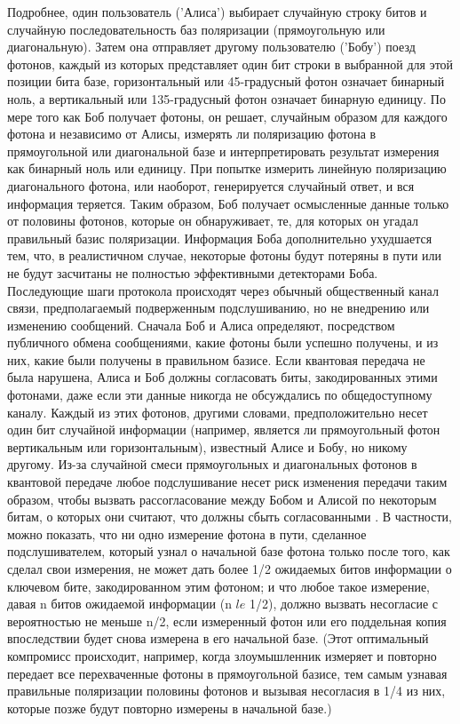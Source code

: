 Подробнее, один пользователь ('Алиса') выбирает случайную строку битов и случайную последовательность баз поляризации (прямоугольную или диагональную). Затем она отправляет другому пользователю ('Бобу') поезд фотонов, каждый из которых представляет один бит строки в выбранной для этой позиции бита базе, горизонтальный или 45-градусный фотон означает бинарный ноль, а вертикальный или 135-градусный фотон означает бинарную единицу. По мере того как Боб получает фотоны, он решает, случайным образом для каждого фотона и независимо от Алисы, измерять ли поляризацию фотона в прямоугольной или диагональной базе и интерпретировать результат измерения как бинарный ноль или единицу.  При попытке измерить линейную поляризацию диагонального фотона, или наоборот, генерируется случайный ответ, и вся информация теряется. Таким образом, Боб получает осмысленные данные только от половины фотонов, которые он обнаруживает, те, для которых он угадал правильный базис поляризации. Информация Боба дополнительно ухудшается тем, что, в реалистичном случае, некоторые фотоны будут потеряны в пути или не будут засчитаны не полностью эффективными детекторами Боба. Последующие шаги протокола происходят через обычный общественный канал связи, предполагаемый подверженным подслушиванию, но не внедрению или изменению сообщений. Сначала Боб и Алиса определяют, посредством публичного обмена сообщениями, какие фотоны были успешно получены, и из них, какие были получены в правильном базисе. Если квантовая передача не была нарушена, Алиса и Боб должны согласовать  биты, закодированных этими фотонами, даже если эти данные никогда не обсуждались по общедоступному каналу. Каждый из этих фотонов, другими словами, предположительно несет один бит случайной информации (например, является ли прямоугольный фотон вертикальным или горизонтальным), известный Алисе и Бобу, но никому другому.
Из-за случайной смеси прямоугольных и диагональных фотонов в квантовой передаче любое подслушивание несет риск изменения передачи таким образом, чтобы вызвать рассогласование между Бобом и Алисой по некоторым битам, о которых они считают, что должны сбыть согласованными . В частности, можно показать, что ни одно измерение фотона в пути, сделанное подслушивателем, который узнал о начальной базе фотона только после того, как сделал свои измерения, не может дать более 1/2 ожидаемых битов информации о ключевом бите, закодированном этим фотоном; и что любое такое измерение, давая n битов ожидаемой информации (n $le$ 1/2), должно вызвать несогласие с вероятностью не меньше n/2, если измеренный фотон или его поддельная копия впоследствии будет снова измерена в его начальной базе. (Этот оптимальный компромисс происходит, например, когда злоумышленник измеряет и повторно передает все перехваченные фотоны в прямоугольной базисе, тем самым узнавая правильные поляризации половины фотонов и вызывая несогласия в 1/4 из них, которые позже будут повторно измерены в начальной базе.)
